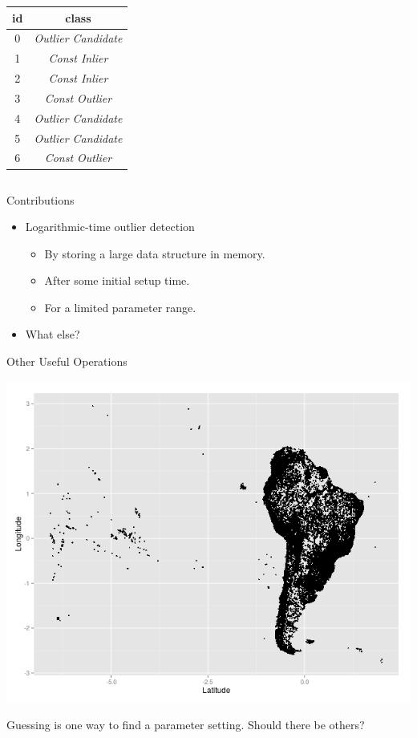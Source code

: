 \documentclass{beamer}
\begin{document}
\begin{frame}
{\begin{columns}
\begin{column}{.5\textwidth}
\begin{tabular}{|c|c|}
                    id & class \\
                    \hline
                    0 & \textit{Outlier Candidate} \\
                    1 & \textit{Const Inlier} \\
                    2 & \textit{Const Inlier} \\
                    3 & \textit{Const Outlier} \\
                    4 & \textit{Outlier Candidate} \\
                    5 & \textit{Outlier Candidate} \\
                    6 & \textit{Const Outlier} \\
                    \hline
                \end{tabular}
            \end{column}
        \end{columns}
    }
    \end{frame}
    \begin{frame}{Contributions}
        \begin{itemize}
            \item Logarithmic-time outlier detection 
                \begin{itemize}
                    \item By storing a large data structure in memory.
                    \item After some initial setup time.
                    \item For a limited parameter range.
                \end{itemize}
            \item What else?
        \end{itemize}
    \end{frame}
    \begin{frame}{Other Useful Operations}
    \begin{center}
        \includegraphics[width=\textwidth]{images/south_america.png}
    \end{center}
    Guessing is one way to find a parameter setting. Should there be others?
    \end{frame}
\end{document}
